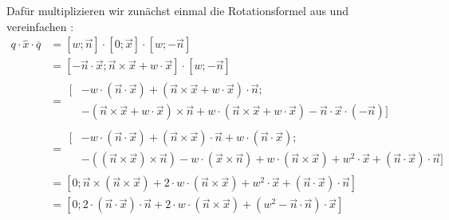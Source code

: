 Dafür multiplizieren wir zunächst einmal die Rotationsformel aus und vereinfachen :
\begin{equation}
\begin{split}
 q \cdot \hat{x} \cdot \overline{q} &= \left[ w; \vec n \right] \cdot \left[ 0; \vec x \right] \cdot \left[ w; -\vec n \right] \\
 &= \left[ - \vec n \cdot \vec x; \vec n \times \vec x + w \cdot \vec x \right] \cdot \left[ w; -\vec n \right] \\
 &= \begin{split}[ &- w \cdot ( \vec n \cdot \vec x ) + ( \vec n \times \vec x + w \cdot \vec x ) \cdot \vec n; \\
  &- ( \vec n \times \vec x + w \cdot \vec x ) \times \vec n + w \cdot ( \vec n \times \vec x + w \cdot \vec x ) - \vec n \cdot \vec x \cdot ( - \vec n ) ] \end{split} \\
 &= \begin{split}[ &- w \cdot ( \vec n \cdot \vec x ) + ( \vec n \times \vec x ) \cdot \vec n + w \cdot ( \vec n \cdot \vec x ); \\
  &- ( ( \vec n \times \vec x ) \times \vec n ) - w \cdot ( \vec x \times \vec n ) + w \cdot ( \vec n \times \vec x ) + w^2 \cdot \vec x + ( \vec n \cdot \vec x ) \cdot \vec n ] \end{split} \\
 &= \left[ 0; \vec n \times ( \vec n \times \vec x ) + 2 \cdot w \cdot ( \vec n \times \vec x ) + w^2 \cdot \vec x + ( \vec n \cdot \vec x ) \cdot \vec n \right] \\
 &= \left[ 0; 2 \cdot ( \vec n \cdot \vec x ) \cdot \vec n + 2 \cdot w \cdot ( \vec n \times \vec x ) + ( w^2 - \vec n \cdot \vec n ) \cdot \vec x \right]
\end{split}
\end{equation}

